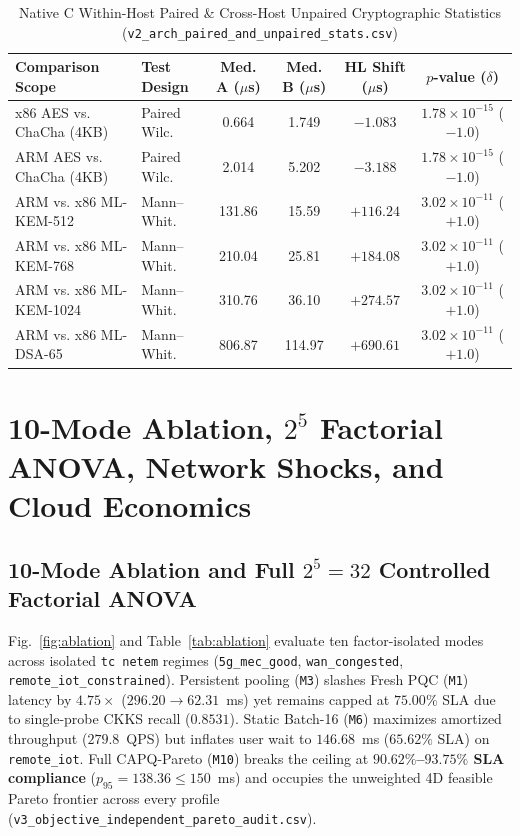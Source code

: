 \documentclass[10pt,journal,compsoc]{IEEEtran}
\begin{document}
\begin{table}[!t]
\centering
\caption{Native C Within-Host Paired \& Cross-Host Unpaired Cryptographic Statistics (\texttt{v2\_arch\_paired\_and\_unpaired\_stats.csv})}
\label{tab:arch}
\setlength{\tabcolsep}{3.0pt}
\begin{tabular}{@{}llcccc@{}}
\toprule
Comparison Scope & Test Design & Med. A ($\mu$s) & Med. B ($\mu$s) & HL Shift ($\mu$s) & $p$-value ($\delta$) \\
\midrule
x86 AES vs. ChaCha (4KB) & Paired Wilc. & 0.664 & 1.749 & $-1.083$ & $1.78\!\times\!10^{-15}$ ($-1.0$) \\
ARM AES vs. ChaCha (4KB) & Paired Wilc. & 2.014 & 5.202 & $-3.188$ & $1.78\!\times\!10^{-15}$ ($-1.0$) \\
ARM vs. x86 ML-KEM-512   & Mann--Whit.  & 131.86& 15.59 & $+116.24$& $3.02\!\times\!10^{-11}$ ($+1.0$) \\
ARM vs. x86 ML-KEM-768   & Mann--Whit.  & 210.04& 25.81 & $+184.08$& $3.02\!\times\!10^{-11}$ ($+1.0$) \\
ARM vs. x86 ML-KEM-1024  & Mann--Whit.  & 310.76& 36.10 & $+274.57$& $3.02\!\times\!10^{-11}$ ($+1.0$) \\
ARM vs. x86 ML-DSA-65    & Mann--Whit.  & 806.87& 114.97& $+690.61$& $3.02\!\times\!10^{-11}$ ($+1.0$) \\
\bottomrule
\end{tabular}
\end{table}

\section{10-Mode Ablation, \texorpdfstring{$2^5$}{2\textasciicircum 5} Factorial ANOVA, Network Shocks, and Cloud Economics}\label{sec:ablation}
\subsection{10-Mode Ablation and Full \texorpdfstring{$2^5=32$}{2\textasciicircum 5=32} Controlled Factorial ANOVA}
Fig.~\ref{fig:ablation} and Table~\ref{tab:ablation} evaluate ten factor-isolated modes across isolated \texttt{tc netem} regimes (\texttt{5g\_mec\_good}, \texttt{wan\_congested}, \texttt{remote\_iot\_constrained}). Persistent pooling (\texttt{M3}) slashes Fresh PQC (\texttt{M1}) latency by $4.75\times$ ($296.20 \to 62.31$~ms) yet remains capped at $75.00\%$ SLA due to single-probe CKKS recall ($0.8531$). Static Batch-16 (\texttt{M6}) maximizes amortized throughput ($279.8$~QPS) but inflates user wait to $146.68$~ms ($65.62\%$ SLA) on \texttt{remote\_iot}. Full CAPQ-Pareto (\texttt{M10}) breaks the ceiling at \textbf{$90.62\%$--$93.75\%$ SLA compliance} ($p_{95}=138.36 \le 150$~ms) and occupies the unweighted 4D feasible Pareto frontier across every profile (\texttt{v3\_objective\_independent\_pareto\_audit.csv}).
\end{document}
